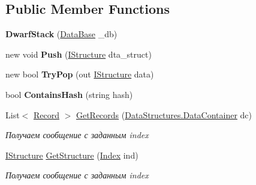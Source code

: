\subsection*{Public Member Functions}
\begin{DoxyCompactItemize}
\item 
\hypertarget{class_dwarf_d_b_1_1_stack_1_1_dwarf_stack_ad48677010f3ce3899b9467616fd9a7ee}{{\bfseries Dwarf\+Stack} (\hyperlink{class_dwarf_d_b_1_1_data_structures_1_1_data_base}{Data\+Base} \+\_\+db)}\label{class_dwarf_d_b_1_1_stack_1_1_dwarf_stack_ad48677010f3ce3899b9467616fd9a7ee}

\item 
\hypertarget{class_dwarf_d_b_1_1_stack_1_1_dwarf_stack_a885ad9cdfe63a8f8d5c55ffda79b075f}{new void {\bfseries Push} (\hyperlink{interface_dwarf_d_b_1_1_data_structures_1_1_i_structure}{I\+Structure} dta\+\_\+struct)}\label{class_dwarf_d_b_1_1_stack_1_1_dwarf_stack_a885ad9cdfe63a8f8d5c55ffda79b075f}

\item 
\hypertarget{class_dwarf_d_b_1_1_stack_1_1_dwarf_stack_afd2936732bb13549a9425b2b7fbeb00b}{new bool {\bfseries Try\+Pop} (out \hyperlink{interface_dwarf_d_b_1_1_data_structures_1_1_i_structure}{I\+Structure} data)}\label{class_dwarf_d_b_1_1_stack_1_1_dwarf_stack_afd2936732bb13549a9425b2b7fbeb00b}

\item 
\hypertarget{class_dwarf_d_b_1_1_stack_1_1_dwarf_stack_ad9a9e05a598682086956db2bfaba217a}{bool {\bfseries Contains\+Hash} (string hash)}\label{class_dwarf_d_b_1_1_stack_1_1_dwarf_stack_ad9a9e05a598682086956db2bfaba217a}

\item 
List$<$ \hyperlink{class_dwarf_d_b_1_1_data_structures_1_1_record}{Record} $>$ \hyperlink{class_dwarf_d_b_1_1_stack_1_1_dwarf_stack_adca3ef11aa4b86f2f6de7f33e06bb13c}{Get\+Records} (\hyperlink{class_dwarf_d_b_1_1_data_structures_1_1_data_container}{Data\+Structures.\+Data\+Container} dc)
\begin{DoxyCompactList}\small\item\em Получаем сообщение с заданным index \end{DoxyCompactList}\item 
\hyperlink{interface_dwarf_d_b_1_1_data_structures_1_1_i_structure}{I\+Structure} \hyperlink{class_dwarf_d_b_1_1_stack_1_1_dwarf_stack_a1cf7979ccc18a74d5a2ff3e0205ca2c7}{Get\+Structure} (\hyperlink{class_dwarf_d_b_1_1_data_structures_1_1_index}{Index} ind)
\begin{DoxyCompactList}\small\item\em Получаем сообщение с заданным index \end{DoxyCompactList}\end{DoxyCompactItemize}



